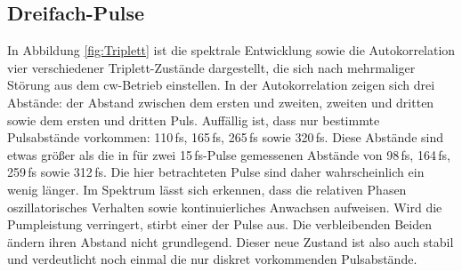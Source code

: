 \documentclass[bachelor,       %
               twoside,        %
               BCOR10mm,       %
               liststotoc,nomtotoc,bibtotoc, %
               english,ngerman, %
               final,          %
               ]{GAUBM}
\begin{document}

\subsection{Dreifach-Pulse}
In Abbildung \ref{fig:Triplett} ist die spektrale Entwicklung sowie die Autokorrelation vier verschiedener Triplett-Zustände dargestellt, die sich nach mehrmaliger Störung aus dem cw-Betrieb einstellen.
In der Autokorrelation zeigen sich drei Abstände: der Abstand zwischen dem ersten und zweiten, zweiten und dritten sowie dem ersten und dritten Puls.
Auffällig ist, dass nur bestimmte Pulsabstände vorkommen: 110\,fs, 165\,fs, 265\,fs sowie 320\,fs.
Diese Abstände sind etwas größer als die in \cite{kitano_stable_1998} für zwei 15\,fs-Pulse gemessenen Abstände von 98\,fs, 164\,fs, 259\,fs sowie 312\,fs.
Die hier betrachteten Pulse sind daher wahrscheinlich ein wenig länger.
Im Spektrum lässt sich erkennen, dass die relativen Phasen oszillatorisches Verhalten sowie kontinuierliches Anwachsen aufweisen.
Wird die Pumpleistung verringert, stirbt einer der Pulse aus.
Die verbleibenden Beiden ändern ihren Abstand nicht grundlegend.
Dieser neue Zustand ist also auch stabil und verdeutlicht noch einmal die nur diskret vorkommenden Pulsabstände.
\end{document}
